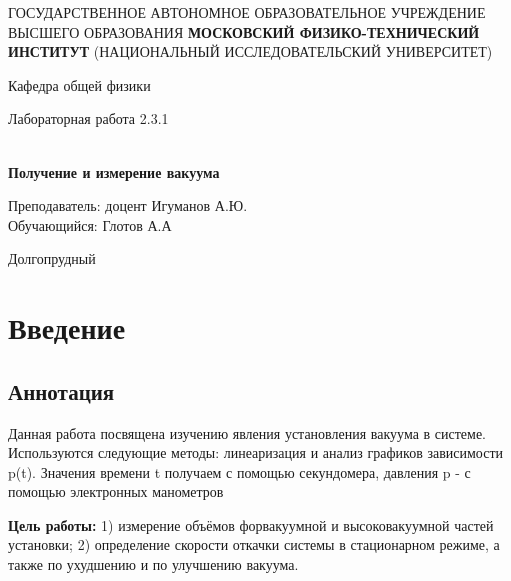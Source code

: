 \documentclass[12pt,a4paper]{article}
\author{Глотов Алексей}
\begin{document}
\newpage
\begin{center}
\footnotesize{{ГОСУДАРСТВЕННОЕ АВТОНОМНОЕ ОБРАЗОВАТЕЛЬНОЕ УЧРЕЖДЕНИЕ}\break
{ВЫСШЕГО ОБРАЗОВАНИЯ}
\break
{\bf {МОСКОВСКИЙ ФИЗИКО-ТЕХНИЧЕСКИЙ ИНСТИТУТ}}
\break
\small{(НАЦИОНАЛЬНЫЙ ИССЛЕДОВАТЕЛЬСКИЙ УНИВЕРСИТЕТ)}}
\break
\hfill \break
\hfill \break
\begin{center}
\normalsize{Кафедра общей физики}
\end{center}
\hfill \break
\hfill \break
\hfill \break
\hfill \break

\begin{center}
\normalsize {Лабораторная работа 2.3.1}
\end{center}
\hfill \break\\
\large{\textbf{Получение и измерение вакуума}}
\end{center}
\begin{flushleft}
\hfill \break
\hfill \break
\hfill \break
\hfill \break
\hfill \break
\hfill \break
\hfill \break
\hfill \break
\hfill \break
\hfill \break
\hangindent=9cm
\normalsize{Преподаватель:}\hfill
\normalsize{доцент Игуманов А.Ю.}\\
\hfill \break
\normalsize{Обучающийся:}\hfill
\normalsize{Глотов А.А} \\
\hfill \break
\end{flushleft}
\hfill \break
\hfill \break
\hfill \break
\hfill \break
\hfill \break
\hfill \break
\hfill \break
\hfill \break
\hfill \break
\hfill \break
\hfill \break

\begin{center}
Долгопрудный 
\end{center}

\thispagestyle{empty}


\newpage
\section{Введение}

\subsection{Аннотация}

Данная работа посвящена изучению явления установления вакуума в системе. Используются следующие методы: линеаризация и анализ графиков зависимости p(t). Значения времени t получаем с помощью секундомера, давления p - с помощью электронных манометров

\textbf{Цель работы:} 1) измерение объёмов форвакуумной и высоковакуумной частей установки; 2) определение скорости откачки системы в стационарном режиме, а также по ухудшению и по улучшению вакуума.
\end{document}
